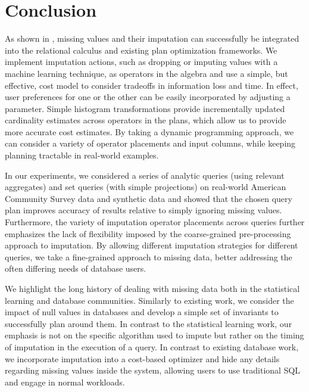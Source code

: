 \section{Conclusion}
As shown in \ProjectName{}, missing values and their imputation can successfully be integrated into the relational calculus and
existing plan optimization frameworks. We implement imputation actions, such as dropping or imputing values with a machine
learning technique, as operators in the algebra and use a simple, but effective, cost model to consider tradeoffs in 
information loss and time. In effect, user preferences for one or the other can be easily incorporated by adjusting a parameter.
Simple histogram transformations
provide incrementally updated cardinality estimates across operators in the plans, which allow us to provide more accurate cost estimates.
By taking a dynamic programming approach, we can consider a variety of operator placements
and input columns, while keeping planning tractable in real-world examples.

In our experiments, we considered a series of analytic queries (using relevant aggregates) and set queries (with simple projections) on real-world
American Community Survey data and synthetic data
and showed that the chosen query plan improves accuracy of results relative to simply ignoring missing values. Furthermore,
the variety of imputation operator placements across queries further emphasizes the lack of flexibility imposed by the coarse-grained
pre-processing approach to imputation. By allowing different imputation strategies for different queries, we
take a fine-grained approach to missing data, better addressing the often differing needs of database users.

We highlight the long history of dealing with missing data both in the statistical learning and database communities.
Similarly to existing work, we consider the impact of null values in databases and develop a simple set of invariants to 
successfully plan around them. In contrast to the statistical learning work, our emphasis is not on the specific algorithm
used to impute but rather on the timing of imputation in the execution of a query. In contrast to existing database work,
we incorporate imputation into a cost-based optimizer and hide any details
regarding missing values inside the system, allowing users to use traditional SQL and engage in normal workloads.


